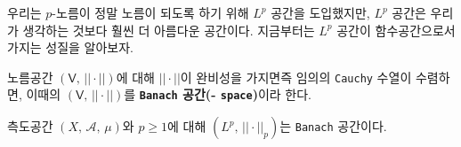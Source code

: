 우리는 $p$-노름이 정말 노름이 되도록 하기 위해 $L^p$ 공간을 도입했지만, $L^p$ 공간은 우리가 생각하는 것보다 훨씬 더 아름다운 공간이다. 지금부터는 $L^p$ 공간이 함수공간으로서 가지는 성질을 알아보자.

\begin{definition}
    노름공간 $(\mathsf{V},\,||\cdot||)$에 대해 $||\cdot||$이 완비성을 가지면즉 임의의 \texttt{Cauchy} 수열이 수렴하면, 이때의 $(\mathsf{V},\,||\cdot||)$를 \textbf{\texttt{Banach} 공간(- \texttt{space})}이라 한다.
\end{definition}

\begin{theorem}\label{thm:lpBanach}
    측도공간 $(X,\,\mathcal{A},\,\mu)$와 $p\geq1$에 대해 $(L^p,\,||\cdot||_p)$는 \texttt{Banach} 공간이다.
\end{theorem}

